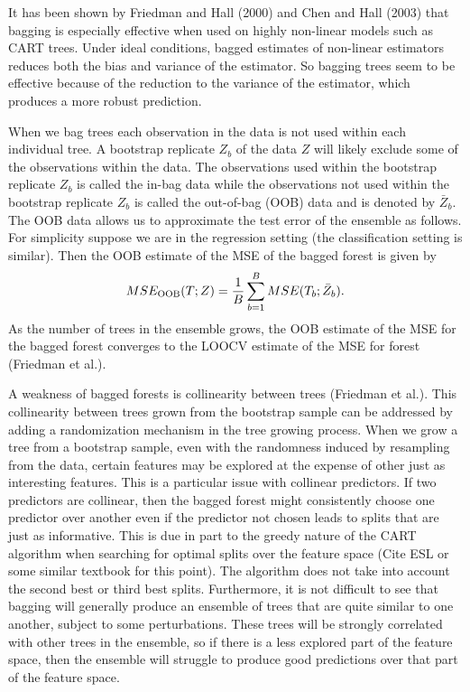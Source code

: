 \documentclass[12pt,twoside]{reedthesis}
\theoremstyle{definition}
\theoremstyle{definition}
\theoremstyle{definition}
\theoremstyle{remark}
\begin{document}
It has been shown by Friedman and Hall (2000) and Chen and Hall (2003)
that bagging is especially effective when used on highly non-linear
models such as CART trees. Under ideal conditions, bagged estimates of
non-linear estimators reduces both the bias and variance of the
estimator. So bagging trees seem to be effective because of the
reduction to the variance of the estimator, which produces a more robust
prediction.

When we bag trees each observation in the data is not used within each
individual tree. A bootstrap replicate \(Z_b\) of the data \(Z\) will
likely exclude some of the observations within the data. The
observations used within the bootstrap replicate \(Z_b\) is called the
in-bag data while the observations not used within the bootstrap
replicate \(Z_b\) is called the out-of-bag (OOB) data and is denoted by
\(\bar{Z}_b\). The OOB data allows us to approximate the test error of
the ensemble as follows. For simplicity suppose we are in the regression
setting (the classification setting is similar). Then the OOB estimate
of the MSE of the bagged forest is given by
\[MSE_{\textup{OOB}}(T;Z)=\frac{1}{B}\sum_{b=1}^B MSE(T_b;\bar{Z}_b).\]
As the number of trees in the ensemble grows, the OOB estimate of the
MSE for the bagged forest converges to the LOOCV estimate of the MSE for
forest (Friedman et al.).

A weakness of bagged forests is collinearity between trees (Friedman et
al.). This collinearity between trees grown from the bootstrap sample
can be addressed by adding a randomization mechanism in the tree growing
process. When we grow a tree from a bootstrap sample, even with the
randomness induced by resampling from the data, certain features may be
explored at the expense of other just as interesting features. This is a
particular issue with collinear predictors. If two predictors are
collinear, then the bagged forest might consistently choose one
predictor over another even if the predictor not chosen leads to splits
that are just as informative. This is due in part to the greedy nature
of the CART algorithm when searching for optimal splits over the feature
space (Cite ESL or some similar textbook for this point). The algorithm
does not take into account the second best or third best splits.
Furthermore, it is not difficult to see that bagging will generally
produce an ensemble of trees that are quite similar to one another,
subject to some perturbations. These trees will be strongly correlated
with other trees in the ensemble, so if there is a less explored part of
the feature space, then the ensemble will struggle to produce good
predictions over that part of the feature space.
\end{document}
